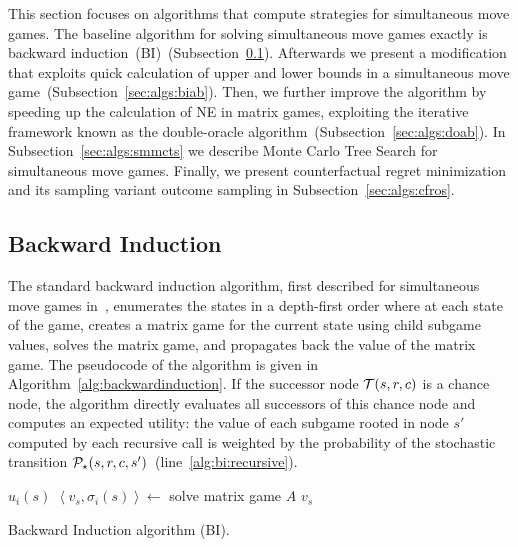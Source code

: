 
This section focuses on algorithms that compute strategies for simultaneous move games.
The baseline algorithm for solving simultaneous move games exactly is backward induction~(BI)~(Subsection~\ref{sec:algs:bi}).
Afterwards we present a modification that exploits quick calculation of upper and lower bounds in a simultaneous move game~(Subsection~\ref{sec:algs:biab}).
Then, we further improve the algorithm by speeding up the calculation of NE in matrix games, exploiting the iterative framework known as the double-oracle algorithm~(Subsection~\ref{sec:algs:doab}).
In Subsection~\ref{sec:algs:smmcts} we describe Monte Carlo Tree Search for simultaneous move games.
Finally, we present counterfactual regret minimization and its sampling variant outcome sampling in Subsection~\ref{sec:algs:cfros}.


\subsection{Backward Induction}\label{sec:algs:bi}

The standard backward induction algorithm, first described for simultaneous move games in~\cite{Ross71Goofspiel}, enumerates the states in a depth-first order where at each state of the game, creates a matrix game for the current state using child subgame values, solves the matrix game, and propagates back the value of the matrix game. The pseudocode of the algorithm is given in Algorithm~\ref{alg:backwardinduction}. If the successor node $\mathcal{T}(s,r,c)$ is a chance node, the algorithm directly evaluates all successors of this chance node and computes an expected utility: the value of each subgame rooted in node $s'$ computed by each recursive call is weighted by the probability of the stochastic transition $\mathcal{P}_\star(s,r,c,s')$~(line~\ref{alg:bi:recursive}).

\begin{algorithm2e}[t]
\small
{}
 {\Return $u_i(s)$} \label{alg:bi:stop1}
$\left\langle v_s, \sigma_i(s) \right\rangle \leftarrow$ solve matrix game $A$\;  \label{alg:bi:solve}
\Return $v_s$ \label{alg:bi:stop2}
\caption{Backward Induction algorithm (BI).}\label{alg:backwardinduction}
\end{algorithm2e}

